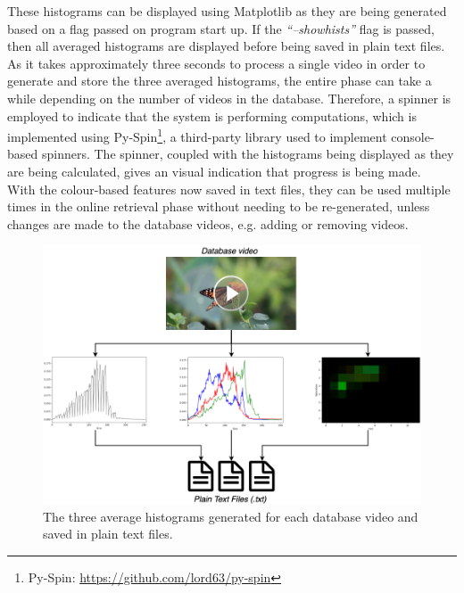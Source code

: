 These histograms can be displayed using Matplotlib as they are being generated based on a flag passed on program start up. If the \textit{``--showhists''} flag is passed, then all averaged histograms are displayed before being saved in plain text files. As it takes approximately three seconds to process a single video in order to generate and store the three averaged histograms, the entire phase can take a while depending on the number of videos in the database. Therefore, a spinner is employed to indicate that the system is performing computations, which is implemented using Py-Spin\footnote{Py-Spin: \url{https://github.com/lord63/py-spin}}, a third-party library used to implement console-based spinners. The spinner, coupled with the histograms being displayed as they are being calculated, gives an visual indication that progress is being made.\\

With the colour-based features now saved in text files, they can be used multiple times in the online retrieval phase without needing to be re-generated, unless changes are made to the database videos, e.g. adding or removing videos.

\begin{figure}[h] 
\centerline{\includegraphics[width=\textwidth]{figures/implementation/all_avg_norm_histograms.png}}
\caption{\label{fig:implementation-all_avg_norm_histograms}The three average histograms generated for each database video and saved in plain text files.}
\end{figure}


